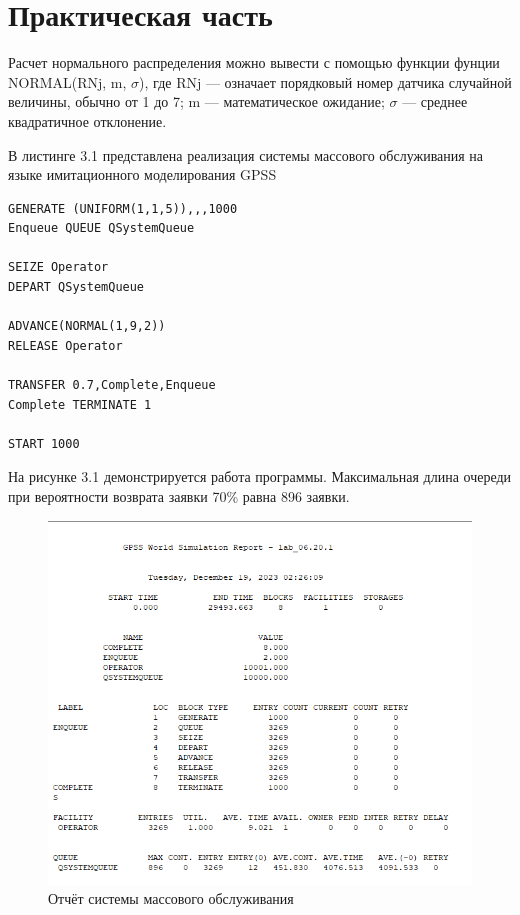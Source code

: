 \chapter{Практическая часть}

Расчет нормального распределения можно вывести с помощью функции фунции NORMAL(RNj, m, $\sigma$), где RNj --- означает  порядковый номер датчика случайной величины, обычно от 1 до 7; m ---  математическое ожидание; $\sigma$ ---  среднее квадратичное отклонение.

В листинге 3.1 представлена реализация системы массового обслуживания на языке имитационного моделирования GPSS

\begin{lstlisting}[caption=Реализация системы массового обслуживания]
GENERATE (UNIFORM(1,1,5)),,,1000
Enqueue QUEUE QSystemQueue

SEIZE Operator
DEPART QSystemQueue

ADVANCE(NORMAL(1,9,2))
RELEASE Operator

TRANSFER 0.7,Complete,Enqueue 
Complete TERMINATE 1

START 1000
\end{lstlisting}

\clearpage

На рисунке 3.1 демонстрируется работа программы. Максимальная длина очереди при вероятности возврата заявки 70\% равна 896 заявки.

\begin{figure}[h]
	\centering
	\includegraphics[height=0.55\textheight]{img/res.png}
	\caption{Отчёт системы массового обслуживания}
	\label{plt:even_comp_alg}
\end{figure}

